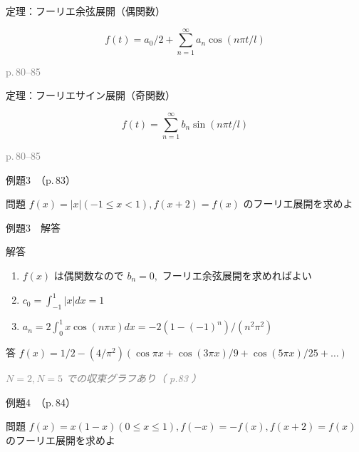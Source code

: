 \documentclass[aspectratio=43,professionalfonts,handout]{beamer}
\begin{document}
\begin{frame}{定理：フーリエ余弦展開（偶関数）}
  \begin{block}{}
  \[
    f(t) = a_{0}/2 + \sum_{n=1}^\infty a_{n}\cos(n\pi t/l)
  \]
  \end{block}
  \vfill\hfill{\scriptsize \textcolor{gray}{p.\,80--85}}
\end{frame}

\begin{frame}{定理：フーリエサイン展開（奇関数）}
  \begin{block}{}
  \[
    f(t) = \sum_{n=1}^\infty b_{n}\sin(n\pi t/l)
  \]
  \end{block}
  \vfill\hfill{\scriptsize \textcolor{gray}{p.\,80--85}}
\end{frame}

\begin{frame}{例題3　（p.\,83）}
  \begin{exampleblock}{問題}
    $f(x) = |x| (-1 \leq x < 1), f(x+2) = f(x)$ のフーリエ展開を求めよ\\[2pt]
  \end{exampleblock}
\end{frame}

\begin{frame}{例題3　解答}
  \begin{exampleblock}{解答}
  \begin{enumerate}[1.]
    \item[] $f(x)$ は偶関数なので $b_{n} = 0,$ フーリエ余弦展開を求めればよい
    \item[] $c_{0} = \int_{-1}^{1} |x| dx = 1$
    \item[] $a_{n} = 2\int_{0}^{1} x \cos(n\pi x) dx = -2(1-(-1)^n)/(n^{2}\pi^{2})$
  \end{enumerate}
  \end{exampleblock}
  \begin{alertblock}{答}
    $f(x) = 1/2 - (4/\pi^{2})(\cos \pi x + \cos(3\pi x)/9 + \cos(5\pi x)/25 + \ldots)$
  \end{alertblock}
  {\footnotesize \textcolor{gray}{\textit{$N=2, N=5$ での収束グラフあり（ p.83 ）}}}
\end{frame}

\begin{frame}{例題4　（p.\,84）}
  \begin{exampleblock}{問題}
    $f(x) = x(1-x) (0 \leq x \leq 1), f(-x) = -f(x), f(x+2) = f(x)$ のフーリエ展開を求めよ\\[2pt]
  \end{exampleblock}
\end{frame}
\end{document}
